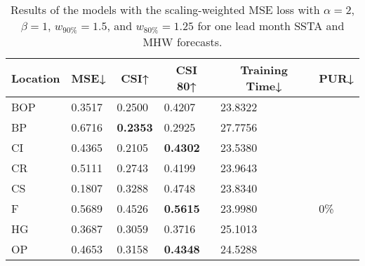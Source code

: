 \documentclass[11pt, a4paper]{article}
\begin{document}
\begin{table}[H]
\centering
\small
\caption{Results of the models with the scaling-weighted MSE loss with $\alpha=2$, $\beta=1$, $w_{90\%}=1.5$, and $w_{80\%}=1.25$ for one lead month SSTA and MHW forecasts.}\label{tb:swmse3}
\begin{tabular}{llllll}
\multicolumn{1}{c}{\textbf{Location}} & \multicolumn{1}{c}{\textbf{MSE↓}} & \multicolumn{1}{c}{\textbf{CSI↑}} & \multicolumn{1}{c}{\textbf{CSI 80↑}} & \multicolumn{1}{c}{\textbf{Training Time↓}} & \multicolumn{1}{c}{\textbf{PUR↓}} \\ \hline
BOP                         & 0.3517                            & 0.2500                            & 0.4207                               & 23.8322                                     &                                   \\
BP                        & 0.6716                            & \textbf{0.2353}                   & 0.2925                               & 27.7756                                     &                                   \\
CI                        & 0.4365                            & 0.2105                            & \textbf{0.4302}                      & 23.5380                                     &                                   \\
CR                           & 0.5111                            & 0.2743                            & 0.4199                               & 23.9643                                     &                                   \\
CS                           & 0.1807                            & 0.3288                            & 0.4748                               & 23.8340                                     &                                   \\
F                             & 0.5689                            & 0.4526                            & \textbf{0.5615}                      & 23.9980                                     & 0\%                               \\
HG                          & 0.3687                            & 0.3059                            & 0.3716                               & 25.1013                                     &                                   \\
OP                       & 0.4653                            & 0.3158                            & \textbf{0.4348}                      & 24.5288                                     &                                   \\

\end{tabular}
\end{table}
\end{document}
